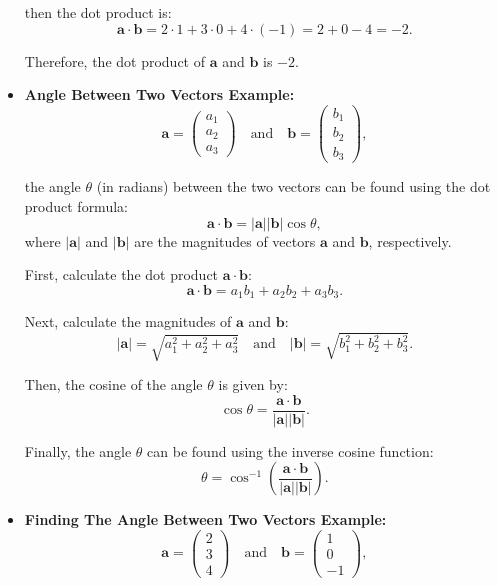 \documentclass[a4paper,12pt]{article}
\begin{document}
\begin{itemize}[leftmargin=*]
then the dot product is:
\[
\mathbf{a} \cdot \mathbf{b} = 2 \cdot 1 + 3 \cdot 0 + 4 \cdot (-1) = 2 + 0 - 4 = -2.
\]

Therefore, the dot product of \(\mathbf{a}\) and \(\mathbf{b}\) is \(-2\).

\item \textbf{Angle Between Two Vectors Example:}
\[
\mathbf{a} = \begin{pmatrix} a_1 \\ a_2 \\ a_3 \end{pmatrix}
\quad \text{and} \quad
\mathbf{b} = \begin{pmatrix} b_1 \\ b_2 \\ b_3 \end{pmatrix},
\]

the angle \(\theta\) (in radians) between the two vectors can be found using the dot product formula:
\[
\mathbf{a} \cdot \mathbf{b} = |\mathbf{a}||\mathbf{b}| \cos \theta,
\]
where \( |\mathbf{a} |\) and \(| \mathbf{b} |\) are the magnitudes of vectors \(\mathbf{a}\) and \(\mathbf{b}\), respectively.

First, calculate the dot product \(\mathbf{a} \cdot \mathbf{b}\):
\[
\mathbf{a} \cdot \mathbf{b} = a_1 b_1 + a_2 b_2 + a_3 b_3.
\]

Next, calculate the magnitudes of \(\mathbf{a}\) and \(\mathbf{b}\):
\[
|\mathbf{a}| = \sqrt{a_1^2 + a_2^2 + a_3^2}
\quad \text{and} \quad
|\mathbf{b}| = \sqrt{b_1^2 + b_2^2 + b_3^2}.
\]

Then, the cosine of the angle \(\theta\) is given by:
\[
\cos \theta = \frac{\mathbf{a} \cdot \mathbf{b}}{|\mathbf{a}| | \mathbf{b}|}.
\]

Finally, the angle \(\theta\) can be found using the inverse cosine function:
\[
\theta = \cos^{-1} \left( \frac{\mathbf{a} \cdot \mathbf{b}}{| \mathbf{a}| |\mathbf{b}|} \right).
\]

\item \textbf{Finding The Angle Between Two Vectors Example:}
\[
\mathbf{a} = \begin{pmatrix} 2 \\ 3 \\ 4 \end{pmatrix}
\quad \text{and} \quad
\mathbf{b} = \begin{pmatrix} 1 \\ 0 \\ -1 \end{pmatrix},
\]


\end{itemize}
\end{document}
